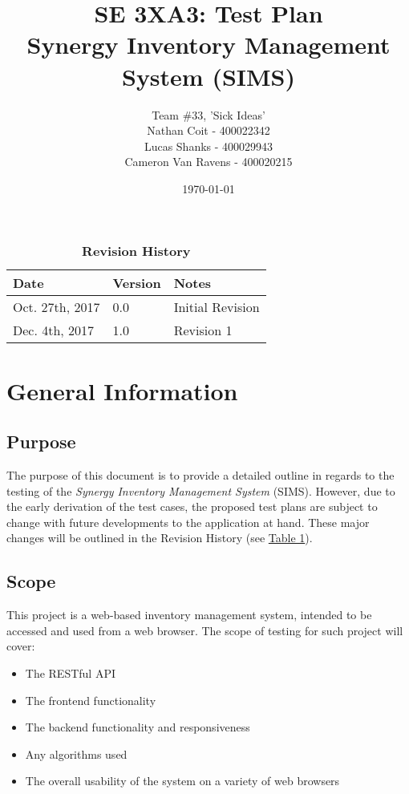 \documentclass[12pt, titlepage]{article}
\title{SE 3XA3: Test Plan\\Synergy Inventory Management System (SIMS)}
\author{Team \#33, 'Sick Ideas'
		\\ Nathan Coit - 400022342
		\\ Lucas Shanks - 400029943
		\\ Cameron Van Ravens - 400020215
}
\date{\today}
\begin{document}
\maketitle

\tableofcontents
\listoftables
\listoffigures

\begin{table}[bp] \label{table:revhist}
\caption{\bf Revision History}
\begin{tabularx}{\textwidth}{p{3cm}p{2cm}X}
\toprule {\bf Date} & {\bf Version} & {\bf Notes}\\
\midrule
Oct. 27th, 2017 & 0.0 & Initial Revision\\
Dec. 4th, 2017 & 1.0 & Revision 1\\
\bottomrule
\end{tabularx}
\end{table}

\newpage


\section{General Information}

\subsection{Purpose}
The purpose of this document is to provide a detailed outline in regards to the testing of the \textit{Synergy Inventory Management System} (SIMS). However, due to the early derivation of the test cases, the proposed test plans are subject to change with future developments to the application at hand. These major changes will be outlined in the Revision History (see \hyperref[table:revhist]{Table 1}). 

\subsection{Scope}
This project is a web-based inventory management system, intended to be accessed and used from a web browser. The scope of testing for such project will cover:
\begin{itemize}
    \item The RESTful API
    \item The frontend functionality
    \item The backend functionality and responsiveness
    \item Any algorithms used
    \item The overall usability of the system on a variety of web browsers
\end{itemize}
\end{document}
